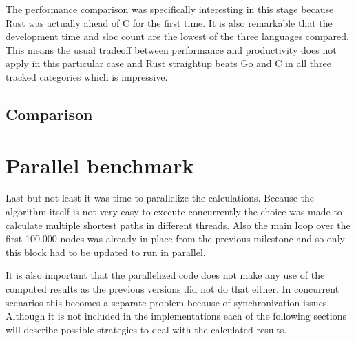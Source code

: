 The performance comparison was specifically interesting in this stage because Rust was actually ahead of C for the first time. It is also remarkable that the development time and \gls{sloc} count are the lowest of the three languages compared. This means the usual tradeoff between performance and productivity does not apply in this particular case and Rust straightup beats Go and C in all three tracked categories which is impressive.

\subsection{Comparison}
\label{subsec:Implementation::SequentialBenchmark::Comparison}



\section{Parallel benchmark}
\label{sec:Implementation::ParallelBenchmark}

Last but not least it was time to parallelize the calculations. Because the algorithm itself is not very easy to execute concurrently the choice was made to calculate multiple shortest paths in different threads. Also the main loop over the first 100.000 nodes was already in place from the previous milestone and so only this block had to be updated to run in parallel.

It is also important that the parallelized code does not make any use of the computed results as the previous versions did not do that either. In concurrent scenarios this becomes a separate problem because of synchronization issues. Although it is not included in the implementations each of the following sections will describe possible strategies to deal with the calculated results.

